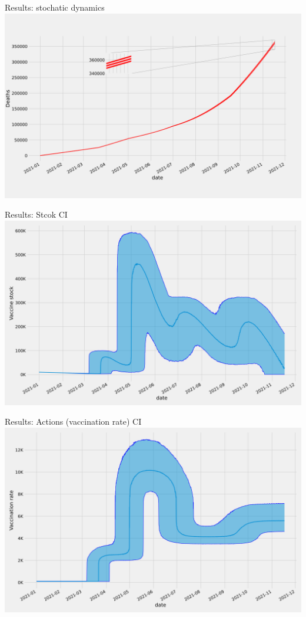 \begin{frame}{Results: stochatic dynamics}
    \centering
    \includegraphics[width=1.05\linewidth]{assets/cumulative_deaths.png}
\end{frame}

\begin{frame}{Results: Stcok CI}
    \centering
    \includegraphics[width=1.05\linewidth]{assets/stock.png}
\end{frame}

\begin{frame}{Results: Actions (vaccination rate) CI}
    \centering
    \includegraphics[width=1.05\linewidth]{assets/action.png}
\end{frame}